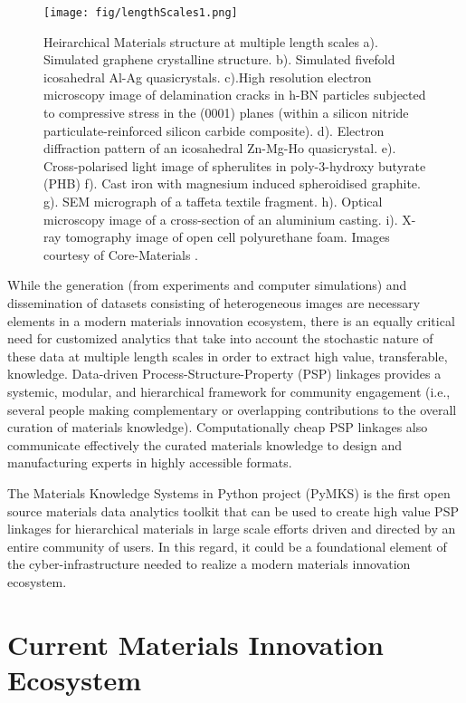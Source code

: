 \documentclass{bmcart}
\begin{document}
\begin{figure}
    \texttt{[image: fig/lengthScales1.png]}
    \caption{Heirarchical Materials structure at multiple length scales
      a). Simulated graphene crystalline structure. b). Simulated fivefold icosahedral Al-Ag quasicrystals. c).High resolution electron microscopy image of delamination cracks in h-BN particles subjected to compressive stress in the (0001) planes (within a silicon nitride particulate-reinforced silicon carbide composite). d). Electron diffraction pattern of an icosahedral Zn-Mg-Ho quasicrystal. e). Cross-polarised light image of spherulites in poly-3-hydroxy butyrate (PHB) f). Cast iron with magnesium induced spheroidised graphite. g). SEM micrograph of a taffeta textile fragment. h). Optical microscopy image of a cross-section of an aluminium casting.  i). X-ray tomography image of open cell polyurethane foam. Images courtesy of Core-Materials \cite{coreMaterials}.}
  \label{fig:length_scales}
\end{figure}

While the generation (from experiments and computer simulations) and dissemination of datasets consisting of heterogeneous images are necessary elements in a modern materials innovation ecosystem, there is an equally critical need for customized analytics that take into account the stochastic nature of these data at multiple length scales in order to extract high value, transferable, knowledge. Data-driven Process-Structure-Property (PSP) linkages \cite{kalidindi2015hierarchical} provides a systemic, modular, and hierarchical framework for community engagement (i.e., several people making complementary or overlapping contributions to the overall curation of materials knowledge). Computationally cheap PSP linkages also communicate effectively the curated materials knowledge to design and manufacturing experts in highly accessible formats.

The Materials Knowledge Systems in Python project (PyMKS) is the first open source materials data analytics toolkit that can be used to create high value PSP linkages for hierarchical materials in large scale efforts driven and directed by an entire community of users. In this regard, it could be a foundational element of the cyber-infrastructure needed to realize a modern materials innovation ecosystem.

\section{Current Materials Innovation Ecosystem}
\end{document}
